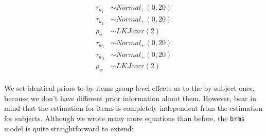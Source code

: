 \documentclass[12pt,]{krantz}
\theoremstyle{definition}
\theoremstyle{definition}
\theoremstyle{definition}
\theoremstyle{remark}
\begin{document}
\begin{equation}
\begin{aligned}
\tau_{u_1} &\sim Normal_+(0,20)\\
\tau_{u_2} &\sim Normal_+(0,20)\\
\rho_u &\sim LKJcorr(2) \\
\tau_{w_1} &\sim Normal_+(0,20)\\
\tau_{w_2} &\sim Normal_+(0,20)\\
\rho_w &\sim LKJcorr(2) \\
\end{aligned}
\end{equation}

We set identical priors to by-items group-level effects as to the
by-subject ones, because we don't have different prior information about
them. However, bear in mind that the estimation for items is completely
independent from the estimation for subjects. Although we wrote many
more equations than before, the \texttt{brms} model is quite
straightforward to extend:
\end{document}
